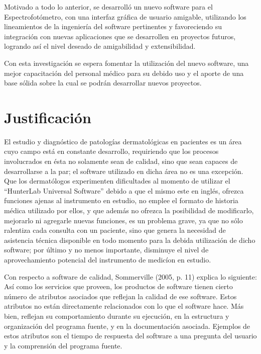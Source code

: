 Motivado a todo lo anterior, se desarroll\'{o} un nuevo software para el Espectrofot\'{o}metro, con una interfaz gr\'{a}fica de usuario amigable, utilizando los lineamientos de la ingenier\'{i}a del software pertinentes y favoreciendo su integraci\'{o}n con nuevas aplicaciones que se desarrollen en proyectos futuros, logrando as\'{i} el nivel deseado de amigabilidad y extensibilidad.

Con esta investigaci\'{o}n se espera fomentar la utilizaci\'{o}n del nuevo software, una mejor capacitaci\'{o}n del personal m\'{e}dico para su debido uso y el aporte de una base s\'{o}lida sobre la cual se podr\'{a}n desarrollar nuevos proyectos.

	\section{Justificaci\'{o}n}
El estudio y diagn\'{o}stico de patolog\'{i}as dermatol\'{o}gicas en pacientes es un \'{a}rea cuyo campo est\'{a} en constante desarrollo, requiriendo que los procesos involucrados en \'{e}sta no solamente sean de calidad, sino que sean capaces de desarrollarse a la par; el software utilizado en dicha \'{a}rea no es una excepci\'{o}n. Que los dermat\'{o}logos experimenten dificultades al momento de utilizar el ``HunterLab Universal Software'' debido a que el mismo este en ingl\'{e}s, ofrezca funciones ajenas al instrumento en estudio, no emplee el formato de historia m\'{e}dica utilizado por ellos, y que adem\'{a}s no ofrezca la posibilidad de modificarlo, mejorarlo ni agregarle nuevas funciones, es un problema grave, ya que no s\'{o}lo ralentiza cada consulta con un paciente, sino que genera la necesidad de asistencia t\'{e}cnica disponible en todo momento para la debida utilizaci\'{o}n de dicho software; por \'{u}ltimo y no menos importante, disminuye el nivel de aprovechamiento potencial del instrumento de medic\'{i}on en estudio.

Con respecto a software de calidad, Sommerville (2005, p. 11) explica lo siguiente: As\'{i} como los servicios que proveen, los productos de software tienen cierto n\'{u}mero de atributos asociados que reflejan la calidad de ese software. Estos atributos no est\'{a}n directamente relacionados con lo que el software hace. M\'{a}s bien, reflejan su comportamiento durante su ejecuci\'{o}n, en la estructura y organizaci\'{o}n del programa fuente, y en la documentaci\'{o}n asociada. Ejemplos de estos atributos son el tiempo de respuesta del software a una pregunta del usuario y la comprensi\'{o}n del programa fuente.

